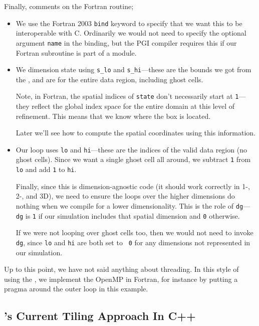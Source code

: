Finally, comments on the Fortran routine;
\begin{itemize}
\item We use the Fortran 2003 {\tt bind} keyword to specify
  that we want this to be interoperable with C.  Ordinarily
  we would not need to specify the optional argument {\tt name}
  in the binding, but the PGI compiler requires this if our
  Fortran subroutine is part of a module.

\item We dimension state using {\tt s\_lo} and {\tt s\_hi}---these are
  the bounds we got from the \farraybox, and are for the entire data
  region, including ghost cells.

  Note, in Fortran, the spatial indices of {\tt state} don't
  necessarily start at {\tt 1}---they reflect the global index space
  for the entire domain at this level of refinement.  This means that
  we know where the box is located.

  Later we'll see how to compute the spatial coordinates using this
  information.

\item Our loop uses {\tt lo} and {\tt hi}---these are the indices
  of the valid data region (no ghost cells).  Since we want a single
  ghost cell all around, we subtract {\tt 1} from {\tt lo} and add {\tt 1}
  to {\tt hi}.

  Finally, since this is dimension-agnostic code (it should work
  correctly in 1-, 2-, and 3D), we need to ensure the loops over the
  higher dimensions do nothing when we compile for a lower
  dimensionality.  This is the role of {\tt dg}---{\tt dg} is {\tt 1}
  if our simulation includes that spatial dimension and {\tt 0}
  otherwise.

  If we were not looping over ghost cells too, then we would not need
  to invoke {\tt dg}, since {\tt lo} and {\tt hi} are both set to {\tt
    0} for any dimensions not represented in our simulation.

\end{itemize}

Up to this point, we have not said anything about threading.  In this
style of using the \mfiter, we implement the OpenMP in Fortran, for
instance by putting a pragma around the outer loop in this example.


\subsection{\boxlib's Current Tiling Approach In C++}
\label{sec:boxlib1}

